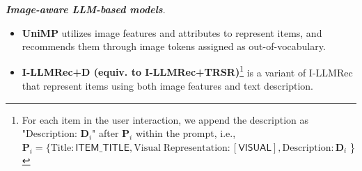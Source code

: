 \documentclass[sigconf]{acmart}
\newcommand{\proposed}{\textsf{I-LLMRec}}
\begin{document}
\smallskip
\textbf{\textit{Image-aware LLM-based models}}.
\begin{itemize}[leftmargin=5mm]
    \item \textbf{UniMP} \cite{wei2024towards} utilizes image features and attributes to represent items, and recommends them through image tokens assigned as out-of-vocabulary.
    \item \textbf{\proposed{}+$\mathbf{D}$ (equiv. to \proposed{}+TRSR)}\footnote{For each item in the user interaction, we append the description as "Description: $\mathbf{D}_i$" after $\mathbf{P}_i$ within the prompt, i.e., 
    $\mathbf{P}_i=\{ \textrm{Title}: \textsf{ITEM\_TITLE}, \textrm{Visual}\; \textrm{Representation}: [ \textsf{VISUAL}], \textrm{Description}: \textbf{D}_i$  \}} is a variant of \proposed{} that represent items using both image features and text description.
\end{itemize}


\end{document}
